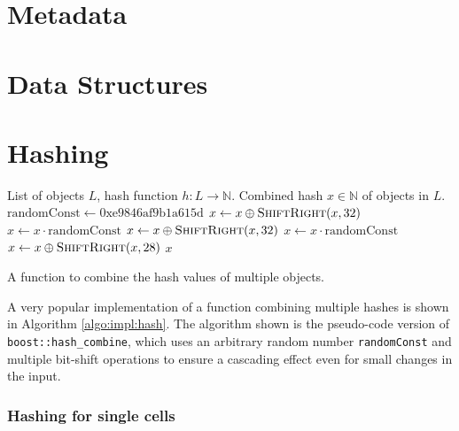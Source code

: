 	\section{Metadata}
	\label{chap:impl:meta}
	
	\section{Data Structures}
	\label{chap:impl:structures}
	
		\clearpage
	
	\section{Hashing}
	\label{chap:impl:hashing}
	
%				
%				
	
		\begin{algorithm}[ht!]
			\centering
			\begin{algorithmic}
				\Require List of objects $L$, hash function $h: L \rightarrow \mathbb{N}$.
				\Ensure Combined hash $x \in \mathbb{N}$ of objects in $L$.
				\Statex
					\State $\mathrm{randomConst} \gets \mathrm{0xe9846af9b1a615d}$
					\State $x \gets x \oplus \Call{ShiftRight}{x, 32}$
					\State $x \gets x \cdot \mathrm{randomConst}$
					\State $x \gets x \oplus \Call{ShiftRight}{x, 32}$
					\State $x \gets x \cdot \mathrm{randomConst}$
					\State $x \gets x \oplus \Call{ShiftRight}{x, 28}$
					\State \Return $x$
				\EndFunction
			\end{algorithmic}
			\caption{A function to combine the hash values of multiple objects.}
			\label{algo:impl:hash}
		\end{algorithm}
	
		A very popular implementation of a function combining multiple hashes is shown in Algorithm \ref{algo:impl:hash}.
		The algorithm shown is the pseudo-code version of \lstinline|boost::hash_combine|, which uses an arbitrary random number \lstinline|randomConst| and multiple bit-shift operations to ensure a cascading effect even for small changes in the input.
	
		\subsubsection{Hashing for single cells}
		
